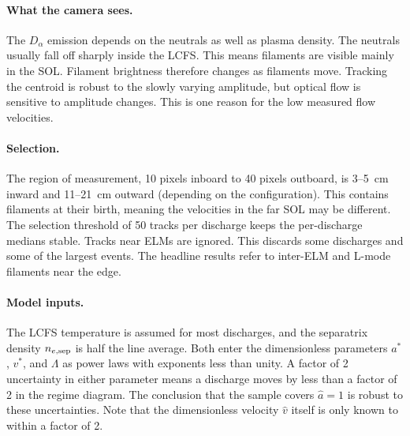 \paragraph{What the camera sees.}
The $D_\alpha$ emission depends on the neutrals as well as plasma density. The neutrals usually fall off sharply inside the LCFS. This means filaments are visible mainly in the SOL. Filament brightness therefore changes as filaments move. Tracking the centroid is robust to the slowly varying amplitude, but optical flow is sensitive to amplitude changes. This is one reason for the low measured flow velocities.

\paragraph{Selection.}
The region of measurement, 10 pixels inboard to 40 pixels outboard, is 3--5~cm inward and 11--21~cm outward (depending on the configuration). This contains filaments at their birth, meaning the velocities in the far SOL may be different. The selection threshold of 50 tracks per discharge keeps the per-discharge medians stable. Tracks near ELMs are ignored. This discards some discharges and some of the largest events. The headline results refer to inter-ELM and L-mode filaments near the edge.

\paragraph{Model inputs.}
The LCFS temperature is assumed for most discharges, and the separatrix density $n_{e,\rm sep}$ is half the line average. Both enter the dimensionless parameters $a^*$, $v^*$, and $\Lambda$ as power laws with exponents less than unity. A factor of 2 uncertainty in either parameter means a discharge moves by less than a factor of 2 in the regime diagram. The conclusion that the sample covers $\hat a = 1$ is robust to these uncertainties. Note that the dimensionless velocity $\hat v$ itself is only known to within a factor of 2.
